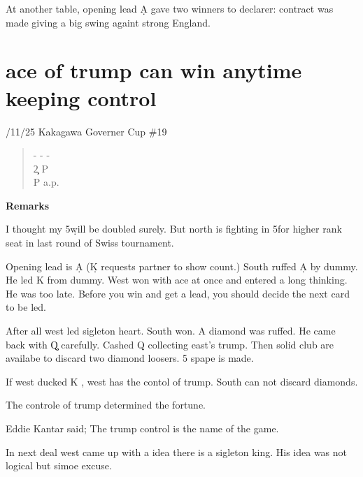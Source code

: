At another table, opening lead \d A gave two winners to declarer:
contract was made giving a big swing againt strong England.

\section {ace of trump can win anytime keeping control}
/11/25 Kakagawa Governer Cup \#19
\begin{quote}
%
  {}%
  {}
  {}%
  {}%
\end{quote}
\begin{quote}
\begin{bidding}
- \> -  \> - \s \\
2\d  {}\c {}\d \> P \\
P  \s \> a.p.
\end{bidding}
\end{quote}
{\bf Remarks}

I thought my 5\d will be doubled surely. But north is
fighting in 5\s for higher rank seat in last round of
Swiss tournament.

Opening lead is \d A (\d K requests partner to show 
count.) South ruffed \d A by dummy. He led \s K from 
dummy. West won with ace at once and entered a long thinking.
He was too late. Before you win  and get a lead, you should decide
the next card to be led.

After all west led sigleton heart. South won. A diamond was
ruffed. He came back with \c Q carefully. Cashed \s Q collecting
east's trump. Then solid club are availabe to discard two diamond
loosers. 5 spape is made.

If west ducked \s K , west has the contol of trump.
South can not discard diamonds. 

The controle of trump determined the fortune.

Eddie Kantar said; The trump control is the name of the game.





\vspace{0.5cm}

In next deal west came up with a idea there is a sigleton king.
His idea  was not logical but simoe excuse.\\

